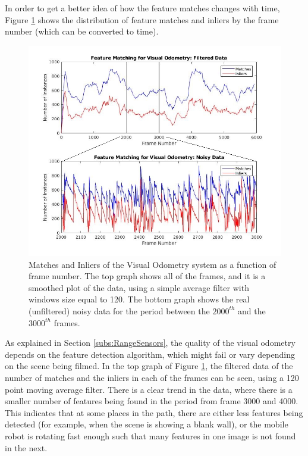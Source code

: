 \documentclass[11pt]{article}
\begin{document}
In order to get a better idea of how the feature matches changes with time, Figure \ref{fig:InliersandOutliersVO} shows the distribution of feature matches and inliers by the frame number (which can be converted to time). 

\begin{figure}[h]
	\includegraphics[width=\linewidth]{VisualOdometry/InliertoMatches}
	\caption{Matches and Inliers of the Visual Odometry system as a function of frame number. The top graph shows all of the frames, and it is a smoothed plot of the data, using a simple average filter with windows size equal to 120.  The bottom graph shows the real (unfiltered) noisy data for the period between the $2000^{th}$ and the $3000^{th}$ frames.}
	\label{fig:InliersandOutliersVO}
\end{figure}

As explained in Section \ref{subs:RangeSensors}, the quality of the visual odometry depends on the feature detection algorithm, which might fail or vary depending on the scene being filmed. In the top graph of Figure \ref{fig:InliersandOutliersVO}, the filtered data of the number of matches and the inliers in each of the frames can be seen, using a 120 point moving average filter. There is a clear trend in the data, where there is a smaller number of features being found in the period from frame 3000 and 4000. This indicates that at some places in the path, there are either less features being detected (for example, when the scene is showing a blank wall), or the mobile robot is rotating fast enough such that many features in one image is not found in the next.
\end{document}
